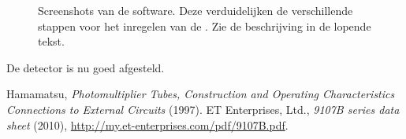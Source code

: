\begin{figure}
\centering
{}
\hfill
{}
\hfill
{}

\vspace{1em}

\hfill
{}
\hfill
{}

\vspace{1em}

\hfill
{}
\hfill
{}

\caption{Screenshots van de \daq software.  Deze verduidelijken de
verschillende stappen voor het inregelen van de \pmts.  Zie de
beschrijving in de lopende tekst.}
\end{figure}

De detector is nu goed afgesteld.


\begin{thebibliography}{9}
 Hamamatsu, \emph{Photomultiplier Tubes, Construction
and Operating Characteristics Connections to External Circuits} (1997).
 ET Enterprises, Ltd., \emph{9107B series data sheet}
(2010), \url{http://my.et-enterprises.com/pdf/9107B.pdf}.
\end{thebibliography}


